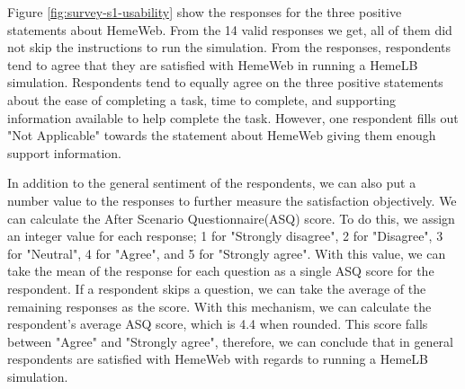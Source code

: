 \vspace{0.5cm}

\noindent%
\begin{minipage}{\linewidth}%
 \label{fig:survey-s1-usability}%
\end{minipage}
\vspace{0.5cm}


Figure \ref{fig:survey-s1-usability} show the responses for the three positive statements about HemeWeb. From the 14 valid responses we get, all of them did not skip the instructions to run the simulation. From the responses, respondents tend to agree that they are satisfied with HemeWeb in running a HemeLB simulation. Respondents tend to equally agree on the three positive statements about the ease of completing a task, time to complete, and supporting information available to help complete the task. However, one respondent fills out "Not Applicable" towards the statement about HemeWeb giving them enough support information. 

In addition to the general sentiment of the respondents, we can also put a number value to the responses to further measure the satisfaction objectively. We can calculate the After Scenario Questionnaire(ASQ) score. To do this, we assign an integer value for each response; 1 for "Strongly disagree", 2 for "Disagree", 3 for "Neutral", 4 for "Agree", and 5 for "Strongly agree". With this value, we can take the mean of the response for each question as a single ASQ score for the respondent. If a respondent skips a question, we can take the average of the remaining responses as the score. With this mechanism, we can calculate the respondent's average ASQ score, which is 4.4 when rounded. This score falls between "Agree" and "Strongly agree", therefore, we can conclude that in general respondents are satisfied with HemeWeb with regards to running a HemeLB simulation.



